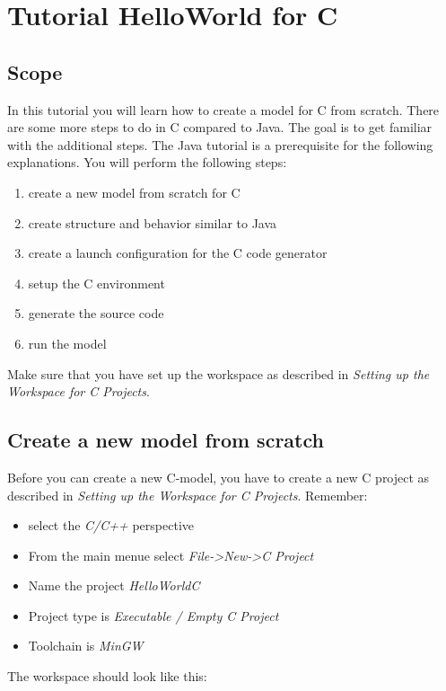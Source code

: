 \chapter{Tutorial HelloWorld for C}

\section{Scope}

In this tutorial you will learn how to create a model for C from scratch. There are some more steps to do in C compared to Java. The goal is to get familiar with the additional steps. The Java tutorial is a prerequisite for the following explanations. 
You will perform the following steps:

\begin{enumerate}
\item create a new model from scratch for C
\item create structure and behavior similar to Java
\item create a launch configuration for the C code generator
\item setup the C environment
\item generate the source code
\item run the model
\end{enumerate}

Make sure that you have set up the workspace as described in \textit{Setting up the Workspace for C Projects}.


\section{Create a new model from scratch}

Before you can create a new C-model, you have to create a new C project as described in \textit{Setting up the Workspace for C Projects}.
Remember:
\begin{itemize}
\item select the \textit{C/C++} perspective
\item From the main menue select \textit{File->New->C Project}
\item Name the project \textit{HelloWorldC}
\item Project type is \textit{Executable / Empty C Project}
\item Toolchain is \textit{MinGW}
\end{itemize}

The workspace should look like this:

